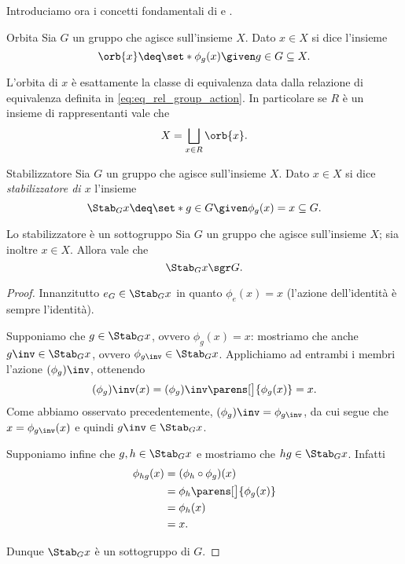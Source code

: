 Introduciamo ora i concetti fondamentali di  e .

\begin{definition}{Orbita}{}
    Sia $G$ un gruppo che agisce sull'insieme $X$. Dato $x \in X$ si dice  l'insieme \[
        \orb{x} \deq \set*{\phi_g(x) \given g \in G} \subseteq X.    
    \]
\end{definition}

\begin{remark}
    L'orbita di $x$ è esattamente la classe di equivalenza data dalla relazione di equivalenza definita in \eqref{eq:eq_rel_group_action}. In particolare se $R$ è un insieme di rappresentanti vale che \[
        X = \bigsqcup_{x \in R} \orb{x}.    
    \]
\end{remark}

\begin{definition}{Stabilizzatore}{}
    Sia $G$ un gruppo che agisce sull'insieme $X$. Dato $x \in X$ si dice \emph{stabilizzatore di $x$} l'insieme \[
        \Stab_{G}{x} \deq \set*{g \in G \given \phi_g(x) = x} \subseteq G.    
    \]
\end{definition}

\begin{proposition}
    {Lo stabilizzatore è un sottogruppo}{}
    Sia $G$ un gruppo che agisce sull'insieme $X$; sia inoltre $x \in X$. Allora vale che \[
        \Stab_{G}{x} \sgr G.    
    \]
\end{proposition}
\begin{proof}
    Innanzitutto $e_G \in \Stab_{G}{x}$ in quanto $\phi_e(x) = x$ (l'azione dell'identità è sempre l'identità).

     Supponiamo che $g \in \Stab_{G}{x}$, ovvero $\phi_g(x) = x$: mostriamo che anche $g\inv \in \Stab_{G}{x}$, ovvero $\phi_{g\inv} \in \Stab_{G}{x}$. Applichiamo ad entrambi i membri l'azione $(\phi_g)\inv$, ottenendo \begin{align*}
        (\phi_g)\inv(x) = (\phi_g)\inv\parens[\big]{\phi_g(x)} = x.
    \end{align*} Come abbiamo osservato precedentemente, $(\phi_g)\inv = \phi_{g\inv}$, da cui segue che $x = \phi_{g\inv}(x)$ e quindi $g\inv \in \Stab_{G}{x}$.

     Supponiamo infine che $g, h \in \Stab_{G}{x}$ e mostriamo che $hg \in \Stab_{G}{x}$. Infatti \begin{align*}
        \phi_{hg}(x) &= (\phi_h \circ \phi_g)(x)\\
        &= \phi_h\parens[\big]{\phi_g(x)}\\
        &= \phi_h(x)\\
        &= x.
    \end{align*}

    Dunque $\Stab_{G}{x}$ è un sottogruppo di $G$.
\end{proof}

